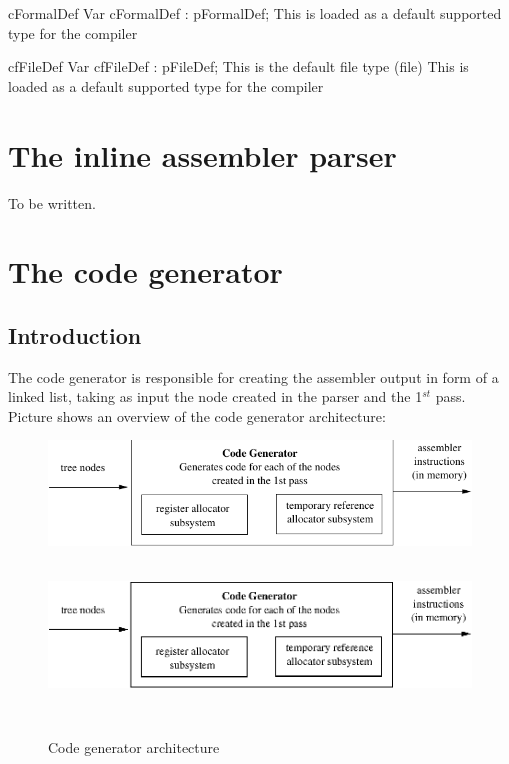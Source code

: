 \documentclass [a4paper,12pt]{article}
\begin{document}
\begin{variable}{cFormalDef}
\Declaration
Var cFormalDef : pFormalDef;
\Notes
This is loaded as a default supported type for the compiler
\end{variable}

\begin{variable}{cfFileDef}
\Declaration
Var cfFileDef : pFileDef;
\Description This is the default file type (\textsf{file})
\Notes This is loaded as a default supported type for the compiler
\end{variable}

\section{The inline assembler parser}
\label{sec:mylabel6}

To be written.

\section{The code generator}
\label{sec:mylabel7}

\subsection{Introduction}
\label{subsec:introductioneratorer}

The code generator is responsible for creating the assembler output in form
of a linked list, taking as input the node created in the parser and the
1$^{st}$ pass. Picture  shows an overview of the code generator
architecture:

\begin{figure}
\begin{center}
\ifpdf
\includegraphics{arch9.pdf}
\else
\includegraphics[width=5.68in,height=1.76in]{arch9.eps}
\fi
\label{fig:fig9}
\caption{Code generator architecture}
\end{center}
\end{figure}
\end{document}
